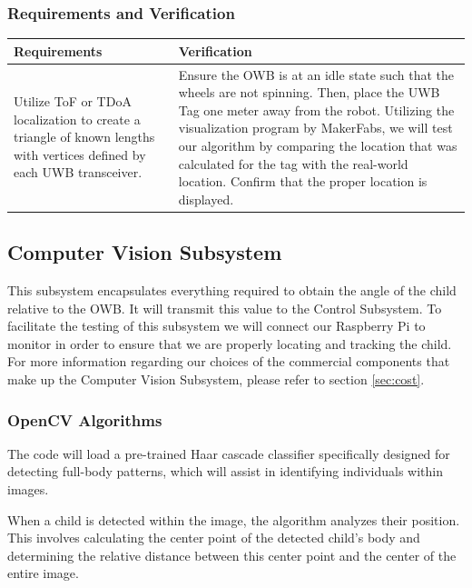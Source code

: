 \documentclass[journal,onecolumn, draftclsnofoot, 12pt]{IEEEtran}
\begin{document}
\newpage

\subsubsection{Requirements and Verification}
\begin{center}
\begin{tabular}{ | m{20em} || m{20em} | } 
  \hline
  Requirements & Verification  \\ 
  \hline
  \hline
  Utilize ToF or TDoA localization to create a triangle of known lengths with vertices defined by each UWB transceiver.
  & 
  Ensure the OWB is at an idle state such that the wheels are not spinning. Then, place the UWB Tag one meter away from the robot. Utilizing the visualization program by MakerFabs, we will test our algorithm by comparing the location that was calculated for the tag with the real-world location. Confirm that the proper location is displayed.
  \\ 
  \hline
\end{tabular}
\end{center}

\subsection{Computer Vision Subsystem}
This subsystem encapsulates everything required to obtain the angle of the child relative to the OWB. It will transmit this value to the Control Subsystem. To facilitate the testing of this subsystem we will connect our Raspberry Pi to monitor in order to ensure that we are properly locating and tracking the child. For more information regarding our choices of the commercial components that make up the Computer Vision Subsystem, please refer to section \ref{sec:cost}.

\vspace{0.5cm}

\subsubsection{OpenCV Algorithms}
The code will load a pre-trained Haar cascade classifier specifically designed for detecting full-body patterns, which will assist in identifying individuals within images.
 
When a child is detected within the image, the algorithm analyzes their position. This involves calculating the center point of the detected child's body and determining the relative distance between this center point and the center of the entire image.
 
\end{document}
